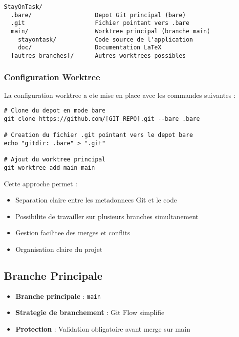 \documentclass[12pt,a4paper]{article}
\begin{document}
\begin{verbatim}
StayOnTask/
  .bare/                  Depot Git principal (bare)
  .git                    Fichier pointant vers .bare
  main/                   Worktree principal (branche main)
    stayontask/           Code source de l'application
    doc/                  Documentation LaTeX
  [autres-branches]/      Autres worktrees possibles
\end{verbatim}

\subsubsection{Configuration Worktree}

La configuration worktree a ete mise en place avec les commandes suivantes :

\begin{lstlisting}[caption=Configuration Git Worktree]
# Clone du depot en mode bare
git clone https://github.com/[GIT_REPO].git --bare .bare

# Creation du fichier .git pointant vers le depot bare
echo "gitdir: .bare" > ".git"

# Ajout du worktree principal
git worktree add main main
\end{lstlisting}

Cette approche permet :
\begin{itemize}
    \item Separation claire entre les metadonnees Git et le code
    \item Possibilite de travailler sur plusieurs branches simultanement
    \item Gestion facilitee des merges et conflits
    \item Organisation claire du projet
\end{itemize}

\subsection{Branche Principale}

\begin{itemize}
    \item \textbf{Branche principale} : \texttt{main}
    \item \textbf{Strategie de branchement} : Git Flow simplifie
    \item \textbf{Protection} : Validation obligatoire avant merge sur main
\end{itemize}
\end{document}
